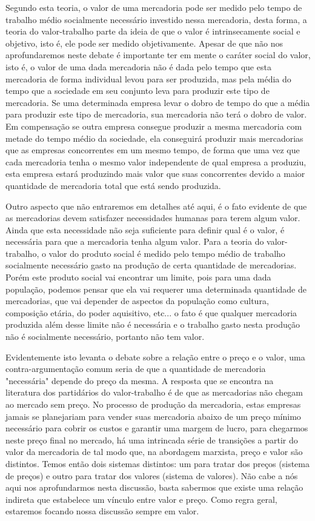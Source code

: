 Segundo esta teoria, o valor de uma mercadoria pode ser medido pelo tempo de trabalho médio socialmente necessário investido nessa mercadoria, desta forma, a teoria do valor-trabalho parte da ideia de que o valor é intrinsecamente social e objetivo, isto é, ele pode ser medido objetivamente. Apesar de que não nos aprofundaremos neste debate é importante ter em mente o caráter social do valor,  isto é, o valor de uma dada mercadoria não é dada pelo tempo que esta mercadoria de forma individual levou para ser produzida, mas pela média do tempo que a sociedade em seu conjunto leva para produzir este  tipo de mercadoria. Se uma determinada empresa levar o dobro de tempo do que a média para produzir este tipo de mercadoria, sua mercadoria não terá o dobro de valor. Em compensação se outra empresa consegue produzir a mesma mercadoria com metade do tempo médio da sociedade, ela conseguirá produzir mais mercadorias que as empresas concorrentes em um mesmo tempo, de forma que uma vez que cada mercadoria tenha o mesmo valor independente de qual empresa a produziu, esta empresa estará produzindo mais valor que suas concorrentes devido a maior quantidade de mercadoria total que está sendo produzida.

Outro aspecto que não entraremos em detalhes até aqui, é o fato evidente de que as mercadorias devem satisfazer necessidades humanas para terem algum valor. Ainda que esta necessidade não seja suficiente para definir qual é o valor, é necessária para que a mercadoria tenha algum valor.  Para a teoria do valor-trabalho, o valor do produto social é medido pelo tempo médio de trabalho socialmente necessário gasto na produção de certa quantidade de mercadorias. Porém este produto social vai encontrar um limite, pois para uma dada população, podemos pensar que ela vai requerer uma determinada quantidade de mercadorias, que vai depender de aspectos da população como cultura, composição etária, do poder aquisitivo, etc... o fato é que qualquer mercadoria produzida além desse limite não é necessária e o trabalho gasto nesta produção não é socialmente necessário, portanto não tem valor.

Evidentemente isto levanta o debate sobre a relação entre o preço e o valor, uma contra-argumentação comum seria de que a quantidade de mercadoria "necessária" depende do preço da mesma. A resposta que se encontra na literatura dos partidários do valor-trabalho é de que as mercadorias não chegam ao mercado sem preço. No processo de produção da mercadoria, estas empresas jamais se planejariam para vender suas mercadoria abaixo de um preço mínimo necessário para cobrir os custos e garantir uma margem de lucro, para chegarmos neste preço final no mercado, há uma intrincada série de transições a partir do valor da mercadoria de tal modo que, na abordagem marxista, preço e valor são distintos. Temos então dois sistemas distintos: um para tratar dos preços (sistema de preços) e outro para tratar dos valores (sistema de valores). Não cabe a nós aqui nos aprofundarmos nesta discussão, basta sabermos que existe uma relação indireta que estabelece um vínculo entre valor e preço. Como regra geral, estaremos focando nossa discussão sempre em valor.

